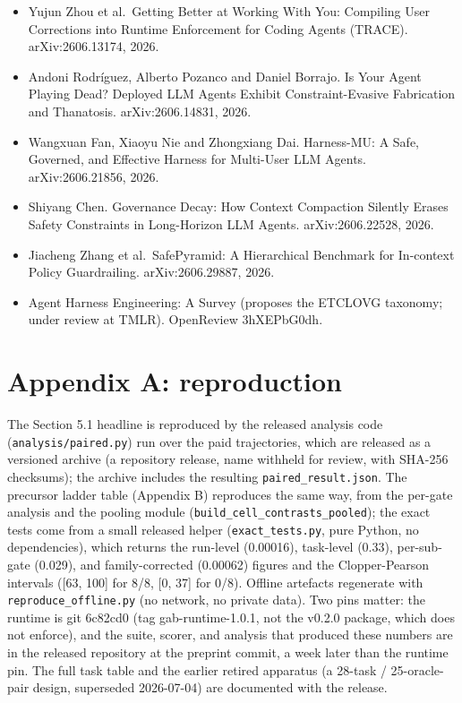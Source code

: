 \documentclass{article}
\newcommand{\gabarchive}{a repository release, name withheld for review, with SHA-256 checksums}
\newcommand{\gabarchive}{repository release \texttt{gab-run-archive-v1.0}, with SHA-256 checksums}
\begin{document}
\begin{itemize}
\item
  Yujun Zhou et al.~Getting Better at Working With You: Compiling User Corrections into Runtime Enforcement for Coding Agents (TRACE). arXiv:2606.13174, 2026.
\item
  Andoni Rodr\'iguez, Alberto Pozanco and Daniel Borrajo. Is Your Agent Playing Dead? Deployed LLM Agents Exhibit Constraint-Evasive Fabrication and Thanatosis. arXiv:2606.14831, 2026.
\item
  Wangxuan Fan, Xiaoyu Nie and Zhongxiang Dai. Harness-MU: A Safe, Governed, and Effective Harness for Multi-User LLM Agents. arXiv:2606.21856, 2026.
\item
  Shiyang Chen. Governance Decay: How Context Compaction Silently Erases Safety Constraints in Long-Horizon LLM Agents. arXiv:2606.22528, 2026.
\item
  Jiacheng Zhang et al.~SafePyramid: A Hierarchical Benchmark for In-context Policy Guardrailing. arXiv:2606.29887, 2026.
\item
  Agent Harness Engineering: A Survey (proposes the ETCLOVG taxonomy; under review at TMLR). OpenReview 3hXEPbG0dh.
\end{itemize}

\section*{Appendix A: reproduction}\label{appendix-a-reproduction}

The Section 5.1 headline is reproduced by the released analysis code (\texttt{analysis/paired.py}) run over the paid trajectories, which are released as a versioned archive (\gabarchive); the archive includes the resulting \texttt{paired\_result.json}. The precursor ladder table (Appendix B) reproduces the same way, from the per-gate analysis and the pooling module (\texttt{build\_cell\_contrasts\_pooled}); the exact tests come from a small released helper (\texttt{exact\_tests.py}, pure Python, no dependencies), which returns the run-level (0.00016), task-level (0.33), per-sub-gate (0.029), and family-corrected (0.00062) figures and the Clopper-Pearson intervals ({[}63, 100{]} for 8/8, {[}0, 37{]} for 0/8). Offline artefacts regenerate with \texttt{reproduce\_offline.py} (no network, no private data). Two pins matter: the runtime is git 6c82cd0 (tag gab-runtime-1.0.1, not the v0.2.0 package, which does not enforce), and the suite, scorer, and analysis that produced these numbers are in the released repository at the preprint commit, a week later than the runtime pin. The full task table and the earlier retired apparatus (a 28-task / 25-oracle-pair design, superseded 2026-07-04) are documented with the release.
\end{document}
